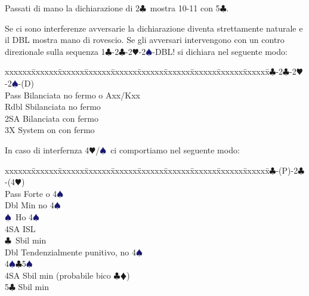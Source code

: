 \documentclass[a4paper,italian]{article}
\newcommand{\BC}{\textcolor{OliveGreen}{$\clubsuit$}}
\newcommand{\BD}{\textcolor{RedOrange}{$\vardiamondsuit$}}
\newcommand{\BH}{\textcolor{Red2}{$\varheartsuit${}}}
\newcommand{\BS}{\textcolor{MidnightBlue}{$\spadesuit${}}}
\newenvironment{bidtable}
{\begin{tabbing}

    xxxxxx\=xxxxxx\=xxxxxx\=xxxxxx\=xxxxxx\=xxxxxx\=xxxxxx\=xxxxxx\=xxxxxx\=xxxxxx\=\kill}
{\end{tabbing} }%
\newenvironment{attenzione}[1]
{\begin{tcolorbox}[colframe=red!80!white,title=#1]}
    {
\end{tcolorbox} }%
\begin{document}
                                Passati di mano la dichiarazione di 2\BC\ mostra 10-11 con 5\BC .

                                \bigbreak
                                \begin{attenzione}{Interferenze}
                                    Se ci sono interferenze avversarie la dichiarazione diventa strettamente naturale e il DBL mostra mano di rovescio. Se gli avversari intervengono con un contro direzionale sulla sequenza 1\BC -2\BC -2\BH -2\BS -DBL! si dichiara nel seguente modo:
                                    \bigbreak
                                    \begin{bidtable}
                                        1\BC-2\BC-2\BH-2\BS-(D)\+\\
                                        Pass \> Bilanciata no fermo o Axx/Kxx\\
                                        Rdbl \> Sbilanciata no fermo\\
                                        2SA \> Bilanciata con fermo\\
                                        3X \> System on con fermo\-
                                    \end{bidtable}
                                    In caso di interfernza 4\BH /\BS\ ci comportiamo nel seguente modo:
                                    \bigbreak
                                    \begin{bidtable}
                                        1\BC-(P)-2\BC-(4\BH)\+\\
                                        Pass \> Forte o 4\BS\ \\
                                        \>Dbl Min no 4\BS\ \\
                                        \BS\ Ho 4\BS\ \\
                                        \>4SA ISL\\
                                        \BC\ Sbil min\\
                                        Dbl \> Tendenzialmente punitivo, no 4\BS \\
                                        4\BS {}\BC 5\BS \\
                                        4SA \> Sbil min (probabile bico \BC \BD )\\
                                        5\BC \> Sbil min\-
                                    \end{bidtable}

\end{attenzione}
\end{document}
